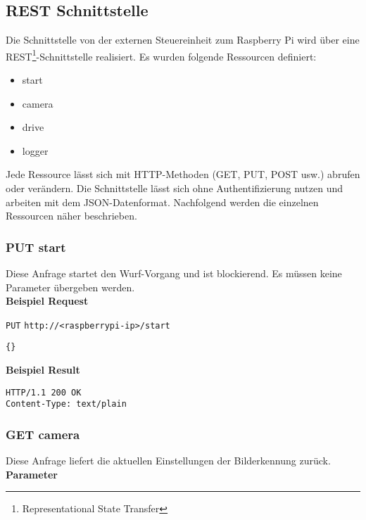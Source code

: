 \subsection{REST Schnittstelle}
Die Schnittstelle von der externen Steuereinheit zum Raspberry Pi wird über eine REST\footnote{Representational State Transfer}-Schnittstelle realisiert. Es wurden folgende Ressourcen definiert:
\begin{itemize}
	\item start
	\item camera
	\item drive
	\item logger
\end{itemize}
Jede Ressource lässt sich mit HTTP-Methoden (GET, PUT, POST usw.) abrufen oder verändern. Die Schnittstelle lässt sich ohne Authentifizierung nutzen und arbeiten mit dem JSON-Datenformat. Nachfolgend werden die einzelnen Ressourcen näher beschrieben.


\subsubsection{PUT start}
Diese Anfrage startet den Wurf-Vorgang und ist blockierend. Es müssen keine Parameter übergeben werden.\\
 
\textbf{Beispiel Request}

\texttt{PUT}
\texttt{http://<raspberrypi-ip>/start}

\begin{lstlisting}[caption=PUT start Request, tabsize=2]
{}
\end{lstlisting}

\textbf{Beispiel Result}

\begin{lstlisting}[caption=PUT start Response, tabsize=2]
HTTP/1.1 200 OK
Content-Type: text/plain
\end{lstlisting}





\subsubsection{GET camera}
Diese Anfrage liefert die aktuellen Einstellungen der Bilderkennung zurück.\\

\textbf{Parameter}

